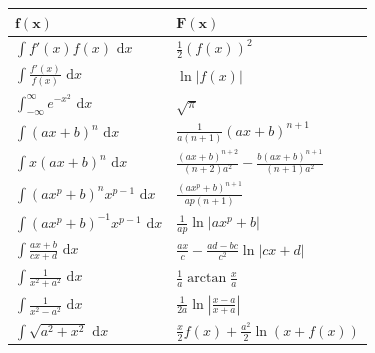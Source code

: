 \documentclass[8pt]{extarticle}
\def\dx{\text{ d}x}
\begin{document}
\begin{multicols*}{3}
\begin{center}
\begin{tabularx}{\linewidth}{>{\centering\arraybackslash}X>{\centering\arraybackslash}X}
  $\mathbf{f(x)}$ & $\mathbf{F(x)}$ \\
  \midrule
  $\int f'(x) f(x) \dx$ & $\frac{1}{2}(f(x))^2$ \\
  $\int \frac{f'(x)}{f(x)} \dx$ & $\ln|f(x)|$ \\
  $\int_{-\infty}^\infty e^{-x^2} \dx$ & $\sqrt{\pi}$ \\
  $\int (ax+b)^n \dx$ & $\frac{1}{a(n+1)}(ax+b)^{n+1}$ \\
  $\int x(ax+b)^n \dx$ & $\frac{(ax+b)^{n+2}}{(n+2)a^2} - \frac{b(ax+b)^{n+1}}{(n+1)a^2}$ \\
  $\int (ax^p+b)^n x^{p-1} \dx$ & $\frac{(ax^p+b)^{n+1}}{ap(n+1)}$ \\
  $\int (ax^p + b)^{-1} x^{p-1} \dx$ & $\frac{1}{ap} \ln |ax^p + b|$ \\
  $\int \frac{ax+b}{cx+d} \dx$ & $\frac{ax}{c} - \frac{ad-bc}{c^2} \ln |cx +d|$ \\
  $\int \frac{1}{x^2+a^2} \dx$ & $\frac{1}{a} \arctan \frac{x}{a}$ \\
  $\int \frac{1}{x^2 - a^2} \dx$ & $\frac{1}{2a} \ln\left| \frac{x-a}{x+a} \right|$ \\
  $\int \sqrt{a^2+x^2} \dx $ & $\frac{x}{2}f(x) + \frac{a^2}{2}\ln(x+f(x))$ \\
  \bottomrule
 \end{tabularx}
\end{center}

\end{multicols*}
\end{document}
